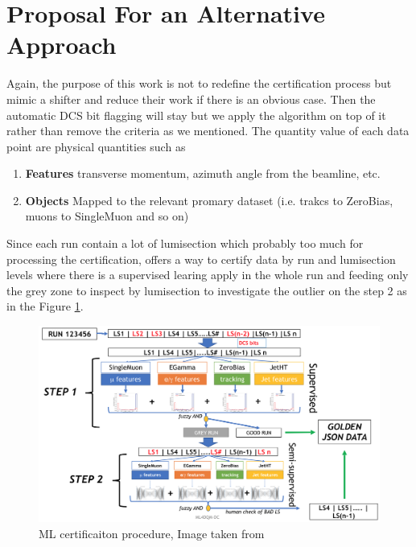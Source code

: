 \section{Proposal For an Alternative Approach}
Again, the purpose of this work is not to redefine the certification process but mimic a shifter and reduce their work if there is an obvious case.
Then the automatic DCS bit flagging will stay but we apply the algorithm on top of it rather than remove the criteria as we mentioned.
The quantity value of each data point are physical quantities such as
\begin{enumerate}
    \item \textbf{Features} transverse momentum, azimuth angle from the beamline, etc.
    \item \textbf{Objects} Mapped to the relevant promary dataset (i.e. trakcs to ZeroBias, muons to SingleMuon and so on)
\end{enumerate}
Since each run contain a lot of lumisection which probably too much for processing the certification, \cite{fiori_ml_dc_florence} offers a way to certify data by run and lumisection levels where there is a supervised learing apply in the whole run and feeding only the grey zone to inspect by lumisection to investigate the outlier on the step 2 as in the Figure \ref{fig:cartoon}.
\begin{figure}[h!]
    \centering
    \includegraphics[width=\textwidth]{images/cartoon.png}
    \caption{ML certificaiton procedure, Image taken from \cite{fiori_ml_dc_florence}}
    \label{fig:cartoon}
\end{figure}